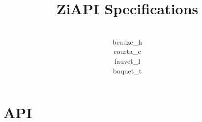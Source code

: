 \documentclass{report}
\title{ZiAPI Specifications}
\author{\\beauze\_h\\courta\_c\\fauvet\_l\\boquet\_t}
\begin{document}
  \maketitle
  \tableofcontents
  \chapter{API}
\end{document}
